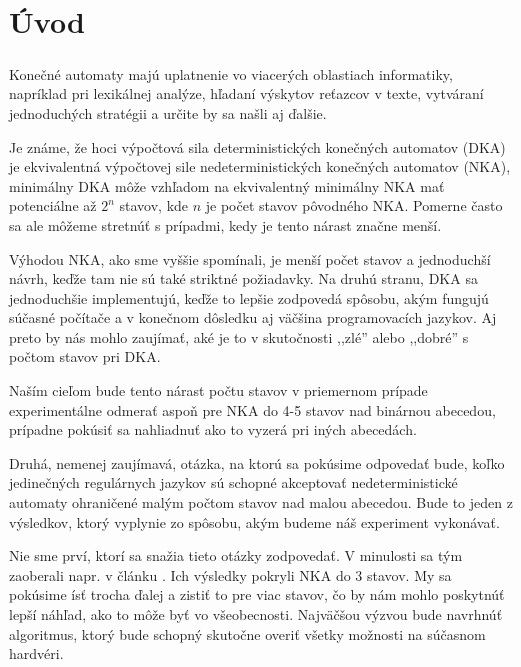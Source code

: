 \chapter*{Úvod}
\paragraph{}
Konečné automaty majú uplatnenie vo viacerých oblastiach informatiky, napríklad pri lexikálnej analýze, hľadaní výskytov reťazcov v texte, vytváraní jednoduchých stratégii a určite by sa našli aj ďalšie.

Je známe, že hoci výpočtová sila deterministických konečných automatov (DKA) je ekvivalentná výpočtovej sile nedeterministických konečných automatov (NKA), minimálny DKA môže vzhľadom na ekvivalentný minimálny NKA mať potenciálne až $2^n$ stavov, kde $n$ je počet stavov pôvodného NKA. Pomerne často sa ale môžeme stretnúť s prípadmi, kedy je tento nárast značne menší.

Výhodou NKA, ako sme vyššie spomínali, je menší počet stavov a jednoduchší návrh, keďže tam nie sú také striktné požiadavky. Na druhú stranu, DKA sa jednoduchšie implementujú, keďže to lepšie zodpovedá spôsobu, akým fungujú súčasné počítače a v konečnom dôsledku aj väčšina programovacích jazykov. Aj preto by nás mohlo zaujímať, aké je to v skutočnosti ,,zlé'' alebo ,,dobré'' s počtom stavov pri DKA. 

Naším cieľom bude tento nárast počtu stavov v priemernom prípade experimentálne odmerať aspoň pre NKA do 4-5 stavov nad binárnou abecedou, prípadne pokúsiť sa nahliadnuť ako to vyzerá pri iných abecedách.

Druhá, nemenej zaujímavá, otázka, na ktorú sa pokúsime odpovedať bude, koľko jedinečných regulárnych jazykov sú schopné akceptovať nedeterministické automaty ohraničené malým počtom stavov nad malou abecedou. Bude to jeden z výsledkov, ktorý vyplynie zo spôsobu, akým budeme náš experiment vykonávať.

Nie sme prví, ktorí sa snažia tieto otázky zodpovedať. V minulosti sa tým zaoberali napr. v článku \cite{shallit}. Ich výsledky pokryli NKA do 3 stavov. My sa pokúsime ísť trocha ďalej a zistiť to pre viac stavov, čo by nám mohlo poskytnúť lepší náhľad, ako to môže byť vo všeobecnosti. Najväčšou výzvou bude navrhnúť algoritmus, ktorý bude schopný skutočne overiť všetky možnosti na súčasnom hardvéri.


